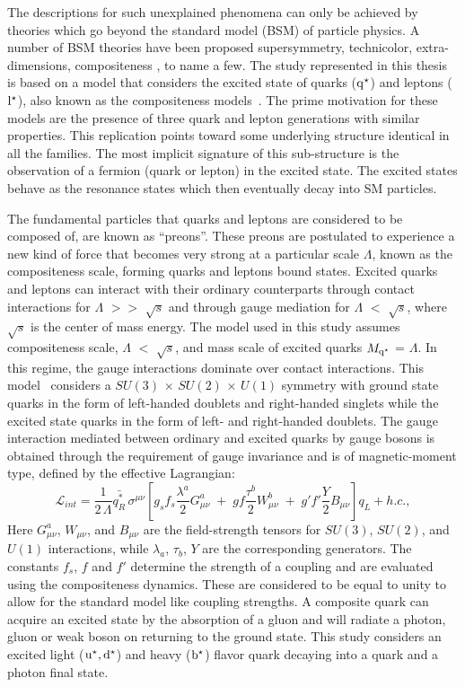 \documentclass[12pt,a4]{article}
\begin{document}
The descriptions for such unexplained phenomena can only be achieved by theories which go beyond the standard model (BSM) of particle physics.
A number of BSM theories have been proposed \eg supersymmetry, technicolor, extra-dimensions, compositeness \etc, to name a few.
The study represented in this thesis is based on a model that considers the excited state of quarks ($\mathrm{q^\star}$) and leptons ($\mathrm{l^\star}$),
also known as the compositeness models~\cite{Pati:1975md, Eichten:1983hw, Baur:1987ga, Baur:1989kv}.
The prime motivation for these models are the presence of three quark and lepton generations with similar properties. This replication points toward
some underlying structure identical in all the families. The most implicit signature of this sub-structure is the observation of a fermion (quark or lepton)
in the excited state. The excited states behave as the resonance states which then eventually decay into SM particles. 

The fundamental particles that quarks and leptons are considered to be composed of, are known as ``preons''. These preons are postulated to experience a new kind of
force that becomes very strong at a particular scale $\Lambda$, known as the compositeness scale, forming quarks and leptons bound states. 
Excited quarks and leptons can interact with their ordinary counterparts through contact interactions for $\Lambda$ $>>$ $\sqrt{s}$ and through gauge
mediation for $\Lambda$ $<$ $\sqrt{s}$, where $\sqrt{s}$ is the center of mass energy. The model used in this study assumes compositeness scale, $\Lambda$
$<$ $\sqrt{s}$, and mass scale of excited quarks $M_{\mathrm{q^\star}}$ = $\Lambda$. In this regime, the gauge interactions dominate over contact interactions.
This model~\cite{Baur:1989kv} considers a $SU(3)$ $\times$ $SU(2)$ $\times$ $U(1)$ symmetry with ground state quarks in the
form of left-handed doublets and right-handed singlets while the excited state quarks in the form of left- and right-handed doublets. 
The gauge interaction mediated between ordinary and excited quarks by gauge bosons is obtained through the
requirement of gauge invariance and is of magnetic-moment type, defined by the effective Lagrangian:
\begin{equation}
{\mathcal L}_{int} = \frac{1}{2\,\Lambda}\bar{q^{\ast}_{R}} \, \sigma^{\mu\nu}
\left[g_{s}f_{s}\frac{\lambda^{a}}{2}G^{a}_{\mu\nu}\;+\;gf\frac{\tau^{b}}{2}W_{\mu\nu}^{b}\;+\;g'f'\frac{Y}{2}B_{\mu\nu} \right] q_{L} + h.c.,
\label{eq:Lagrangian1}
\end{equation}
Here $G^{a}_{\mu\nu}$, $W_{\mu\nu}$, and $B_{\mu\nu}$ are the field-strength tensors for $SU(3)$, $SU(2)$, and $U(1)$ interactions, while $\lambda_{a}$, $\tau_{b}$, $Y$
are the corresponding generators. The constants $f_{s}$, $f$ and $f'$ determine the strength of a coupling and are
evaluated using the compositeness dynamics. These are considered to be equal to unity to allow for the standard model like coupling strengths. 
A composite quark can acquire an excited state by the absorption of a gluon and will radiate a photon, gluon or weak boson on returning to the ground state.
This study considers an excited light ($\mathrm{u^\star},\mathrm{d^\star}$) and heavy ($\mathrm{b^\star}$) flavor quark decaying into a quark and a photon final state.
\end{document}
